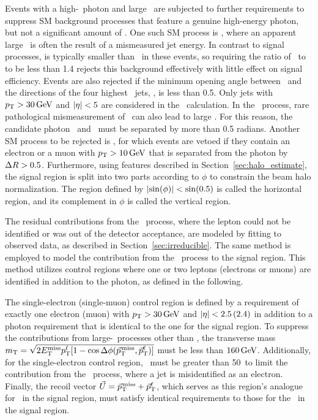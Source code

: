 Events with a high-\pt\ photon and large \met\ are subjected to further requirements to suppress SM background processes that feature a genuine high-energy photon, but not a significant amount of \met.
One such SM process is \gj, where an apparent large \met\ is often the result of a mismeasured jet energy.
In contrast to signal processes, \met is typically smaller than \ETg\ in these events, so requiring the ratio of \ETg\ to \met to be less than 1.4 rejects this background effectively with little effect on signal efficiency. 
Events are also rejected if the minimum opening angle between \ptvecmiss\ and the directions of the four highest \pt\ jets, \minDphiMETj, is less than 0.5. 
Only jets with $p_{\mathrm{T}} > 30\,\text{Ge\hspace{-.08em}V}$ and $\lvert \eta \rvert < 5$ are considered in the \minDphiMETj\ calculation. 
In the \gj\ process, rare pathological mismeasurement of \ETg\ can also lead to large \met. 
For this reason, the candidate photon \ptvec\ and \ptvecmiss\ must be separated by more than 0.5 radians. 
Another SM process to be rejected is \wlng, for which events are vetoed if they contain an electron or a muon with $p_{\mathrm{T}} > 10\,\text{Ge\hspace{-.08em}V}$ that is separated from the photon by $\Delta R > 0.5$.
Furthermore, using features described in Section~\ref{sec:halo_estimate}, the signal region is split into two parts according to $\phi$ to constrain the beam halo normalization. 
The region defined by $\lvert \sin(\phi) \rvert < \sin(0.5)$ is called the horizontal region, and its complement in $\phi$ is called the vertical region.

The residual contributions from the \wlng\ process, where the lepton could not be identified or was out of the detector acceptance, are modeled by fitting to observed data, as described in Section~\ref{sec:irreducible}. 
The same method is employed to model the contribution from the \zinvg\ process to the signal region. 
This method utilizes control regions where one or two leptons (electrons or muons) are identified in addition to the photon, as defined in the following.

The single-electron (single-muon) control region is defined by a requirement of exactly one electron (muon) with $p_{\mathrm{T}} > 30\,\text{Ge\hspace{-.08em}V}$ and $\lvert \eta \rvert < 2.5\,(2.4)$ in addition to a photon requirement that is identical to the one for the signal region. 
To suppress the contributions from large-\met\ processes other than \wlng, the transverse mass $m_{\mathrm{T}} = \sqrt{\smash[b]{2E_{\mathrm{T}}^{\text{miss}}p_{\mathrm{T}}^{\ell}[1-\cos\Delta\phi({\vec p}_{\mathrm{T}}^{\kern1pt\text{miss}},{\vec p}_{\mathrm{T}}^{\ell})]}}$ must be less than $160\,\text{Ge\hspace{-.08em}V}$.
Additionally, for the single-electron control region, \met\ must be greater than 50\GeV\ to limit the contribution from the \gj\ process, where a jet is misidentified as an electron. 
Finally, the recoil vector $\vec{U} = {\vec p}_{\mathrm{T}}^{\kern1pt\text{miss}} + {\vec p}_{\mathrm{T}}^{\ell}$, which serves as this region's analogue for \ptvecmiss\ in the signal region, must satisfy identical requirements to those for the \ptvecmiss\ in the signal region.

